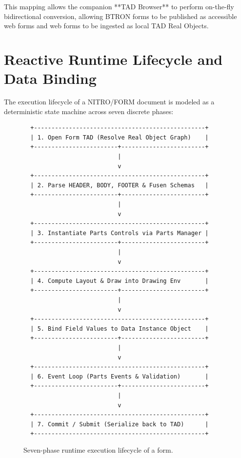 \documentclass[10pt,journal,compsoc,twocolumn]{article}
\begin{document}
This mapping allows the companion **TAD Browser** to perform on-the-fly bidirectional conversion, allowing BTRON forms to be published as accessible web forms and web forms to be ingested as local TAD Real Objects.

\section{Reactive Runtime Lifecycle and Data Binding}
\label{sec:lifecycle}

The execution lifecycle of a NITRO/FORM document is modeled as a deterministic state machine across seven discrete phases:

\begin{figure}[htbp]
\centering
\begin{lstlisting}
  +-------------------------------------------------+
  | 1. Open Form TAD (Resolve Real Object Graph)    |
  +------------------------+------------------------+
                           |
                           v
  +-------------------------------------------------+
  | 2. Parse HEADER, BODY, FOOTER & Fusen Schemas   |
  +------------------------+------------------------+
                           |
                           v
  +-------------------------------------------------+
  | 3. Instantiate Parts Controls via Parts Manager |
  +------------------------+------------------------+
                           |
                           v
  +-------------------------------------------------+
  | 4. Compute Layout & Draw into Drawing Env       |
  +------------------------+------------------------+
                           |
                           v
  +-------------------------------------------------+
  | 5. Bind Field Values to Data Instance Object    |
  +------------------------+------------------------+
                           |
                           v
  +-------------------------------------------------+
  | 6. Event Loop (Parts Events & Validation)       |
  +------------------------+------------------------+
                           |
                           v
  +-------------------------------------------------+
  | 7. Commit / Submit (Serialize back to TAD)      |
  +-------------------------------------------------+
\end{lstlisting}
\caption{Seven-phase runtime execution lifecycle of a form.}
\label{fig:lifecycle}
\end{figure}
\end{document}

